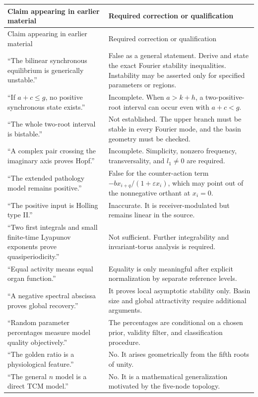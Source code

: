 \documentclass[11pt, reqno]{amsart}
\theoremstyle{definition}
\theoremstyle{remark}
\newcommand{\eps}{\varepsilon}
\begin{document}
	\begin{longtable}{p{5.1cm}p{8.7cm}}
		\toprule
		Claim appearing in earlier material & Required correction or qualification \\
		\midrule
		\endfirsthead
		\toprule
		Claim appearing in earlier material & Required correction or qualification \\
		\midrule
		\endhead
		``The bilinear synchronous equilibrium is generically unstable.'' & False as a general statement.  Derive and state the exact Fourier stability inequalities.  Instability may be asserted only for specified parameters or regions. \\
		``If $a+c\le g$, no positive synchronous state exists.'' & Incomplete.  When $a>k+h$, a two-positive-root interval can occur even with $a+c<g$. \\
		``The whole two-root interval is bistable.'' & Not established.  The upper branch must be stable in every Fourier mode, and the basin geometry must be checked. \\
		``A complex pair crossing the imaginary axis proves Hopf.'' & Incomplete.  Simplicity, nonzero frequency, transversality, and $l_1\ne0$ are required. \\
		``The extended pathology model remains positive.'' & False for the counter-action term $-b x_{i+q}/(1+\eps x_i)$, which may point out of the nonnegative orthant at $x_i=0$. \\
		``The positive input is Holling type II.'' & Inaccurate.  It is receiver-modulated but remains linear in the source. \\
		``Two first integrals and small finite-time Lyapunov exponents prove quasiperiodicity.'' & Not sufficient.  Further integrability and invariant-torus analysis is required. \\
		``Equal activity means equal organ function.'' & Equality is only meaningful after explicit normalization by separate reference levels. \\
		``A negative spectral abscissa proves global recovery.'' & It proves local asymptotic stability only.  Basin size and global attractivity require additional arguments. \\
		``Random parameter percentages measure model quality objectively.'' & The percentages are conditional on a chosen prior, validity filter, and classification procedure. \\
		``The golden ratio is a physiological feature.'' & No.  It arises geometrically from the fifth roots of unity. \\
		``The general $n$ model is a direct TCM model.'' & No.  It is a mathematical generalization motivated by the five-node topology. \\
		\bottomrule
	\end{longtable}
	
\end{document}
